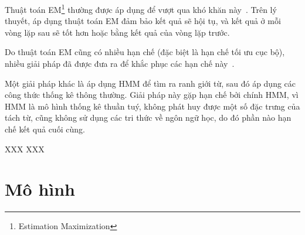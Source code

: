 \documentclass[a4paper,oneside,14pt]{extbook} %
\begin{document}
Thuật toán EM\footnote{Estimation Maximization} thường được áp dụng để vượt
qua khó khăn này~\cite{softcount,Sproat}. Trên lý thuyết, áp dụng
thuật toán EM đảm bảo kết quả sẽ hội tụ, và kết quả ở mỗi vòng lặp sau
sẽ tốt hơn hoặc bằng kết quả của vòng lặp trước. 

Do thuật toán EM cũng có nhiều hạn chế (đặc biệt là hạn chế tối ưu cục
bộ), nhiều giải pháp đã được đưa ra để khắc phục các hạn chế
này~\cite{text-tiling,self-supervised}. 

Một giải pháp khác là áp dụng HMM để tìm ra ranh giới từ, sau đó áp
dụng các công thức thống kê thông thường. Giải pháp này gặp hạn chế
bởi chính HMM, vì HMM là mô hình thống kê thuần tuý, không phát huy
được một số đặc trưng của tách từ, cũng không sử dụng các tri thức về
ngôn ngữ học, do đó phần nào hạn chế kết quả cuối cùng. 

XXX
XXX %





\chapter{Mô hình}
\label{cha:model}
\minitoc
\end{document}
